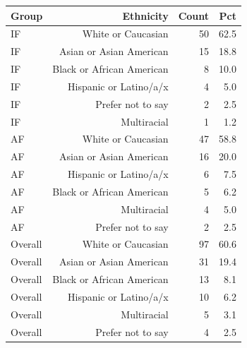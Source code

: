 \begin{tabular}{lrrr}
  \toprule
  Group & Ethnicity & Count & Pct \\ 
  \midrule
  IF & White or Caucasian & 50 & 62.5 \\ 
  IF & Asian or Asian American & 15 & 18.8 \\ 
  IF & Black or African American & 8 & 10.0 \\ 
  IF & Hispanic or Latino/a/x & 4 & 5.0 \\ 
  IF & Prefer not to say & 2 & 2.5 \\ 
  IF & Multiracial & 1 & 1.2 \\ 
  AF & White or Caucasian & 47 & 58.8 \\ 
  AF & Asian or Asian American & 16 & 20.0 \\ 
  AF & Hispanic or Latino/a/x & 6 & 7.5 \\ 
  AF & Black or African American & 5 & 6.2 \\ 
  AF & Multiracial & 4 & 5.0 \\ 
  AF & Prefer not to say & 2 & 2.5 \\ 
  Overall & White or Caucasian & 97 & 60.6 \\ 
  Overall & Asian or Asian American & 31 & 19.4 \\ 
  Overall & Black or African American & 13 & 8.1 \\ 
  Overall & Hispanic or Latino/a/x & 10 & 6.2 \\ 
  Overall & Multiracial & 5 & 3.1 \\ 
  Overall & Prefer not to say & 4 & 2.5 \\ 
  \bottomrule
\end{tabular}
